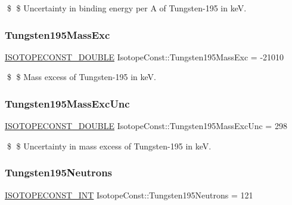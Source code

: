 \$ \$ Uncertainty in binding energy per A of Tungsten-\/195 in keV. \mbox{\label{group___isotope_const-_tungsten-_w195_gab558913964d69d95bad2c8b0d5b9591f}} 
\subsubsection{\texorpdfstring{Tungsten195\+Mass\+Exc}{Tungsten195MassExc}}
{\footnotesize\ttfamily \mbox{\hyperlink{group___isotope_const-_macros_ga8f45a7272ce02c0b4c65c44636ed719a}{I\+S\+O\+T\+O\+P\+E\+C\+O\+N\+S\+T\+\_\+\+D\+O\+U\+B\+LE}} Isotope\+Const\+::\+Tungsten195\+Mass\+Exc = -\/21010}

\$ \$ Mass excess of Tungsten-\/195 in keV. \mbox{\label{group___isotope_const-_tungsten-_w195_ga375dd1425c5e320c294d7716d6d46af9}} 
\subsubsection{\texorpdfstring{Tungsten195\+Mass\+Exc\+Unc}{Tungsten195MassExcUnc}}
{\footnotesize\ttfamily \mbox{\hyperlink{group___isotope_const-_macros_ga8f45a7272ce02c0b4c65c44636ed719a}{I\+S\+O\+T\+O\+P\+E\+C\+O\+N\+S\+T\+\_\+\+D\+O\+U\+B\+LE}} Isotope\+Const\+::\+Tungsten195\+Mass\+Exc\+Unc = 298}

\$ \$ Uncertainty in mass excess of Tungsten-\/195 in keV. \mbox{\label{group___isotope_const-_tungsten-_w195_gae04aad79536fd1e4372bcf2944575fab}} 
\subsubsection{\texorpdfstring{Tungsten195\+Neutrons}{Tungsten195Neutrons}}
{\footnotesize\ttfamily \mbox{\hyperlink{group___isotope_const-_macros_ga5f18360b3e99483a35c32d789e62621c}{I\+S\+O\+T\+O\+P\+E\+C\+O\+N\+S\+T\+\_\+\+I\+NT}} Isotope\+Const\+::\+Tungsten195\+Neutrons = 121}

